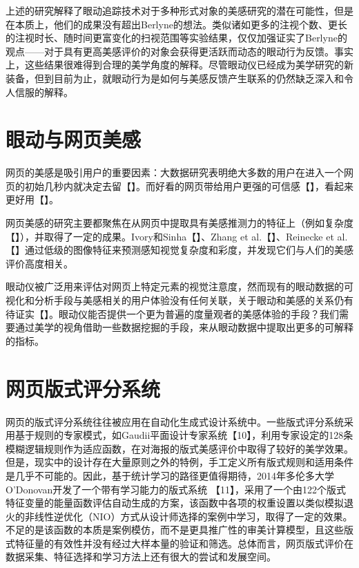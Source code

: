 上述的研究解释了眼动追踪技术对于多种形式对象的美感研究的潜在可能性，但是在本质上，他们的成果没有超出Berlyne的想法。类似诸如更多的注视个数、更长的注视时长、随时间更富变化的扫视范围等实验结果，仅仅加强证实了Berlyne的观点——对于具有更高美感评价的对象会获得更活跃而动态的眼动行为反馈。事实上，这些结果很难得到合理的美学角度的解释。尽管眼动仪已经成为美学研究的新装备，但到目前为止，就眼动行为是如何与美感反馈产生联系的仍然缺乏深入和令人信服的解释。


\section{眼动与网页美感}

网页的美感是吸引用户的重要因素：大数据研究表明绝大多数的用户在进入一个网页的初始几秒内就决定去留【】。而好看的网页带给用户更强的可信感【】，看起来更好用【】。

网页美感的研究主要都聚焦在从网页中提取具有美感推测力的特征上（例如复杂度【】），并取得了一定的成果。Ivory和Sinha【】、Zhang et al.【】、Reinecke et al.【】通过低级的图像特征来预测感知视觉复杂度和彩度，并发现它们与人们的美感评价高度相关。

眼动仪被广泛用来评估对网页上特定元素的视觉注意度，然而现有的眼动数据的可视化和分析手段与美感相关的用户体验没有任何关联，关于眼动和美感的关系仍有待证实【】。眼动仪能否提供一个更为普遍的度量观者的美感体验的手段？我们需要通过美学的视角借助一些数据挖掘的手段，来从眼动数据中提取出更多的可解释的指标。


\section{网页版式评分系统}

网页的版式评分系统往往被应用在自动化生成式设计系统中。一些版式评分系统采用基于规则的专家模式，如Gaudii平面设计专家系统【10】，利用专家设定的128条模糊逻辑规则作为适应函数，在对海报的版式美感评价中取得了较好的美学效果。但是，现实中的设计存在大量原则之外的特例，手工定义所有版式规则和适用条件是几乎不可能的。因此，基于统计学习的路径更值得期待，2014年多伦多大学O’Donovan开发了一个带有学习能力的版式系统 【11】，采用了一个由122个版式特征变量的能量函数评估自动生成的方案，该函数中各项的权重设置以类似模拟退火的非线性逆优化（NIO）方式从设计师选择的案例中学习，取得了一定的效果。不足的是该函数的本质是案例模仿，而不是更具推广性的审美计算模型，且这些版式特征量的有效性并没有经过大样本量的验证和筛选。总体而言，网页版式评价在数据采集、特征选择和学习方法上还有很大的尝试和发展空间。
